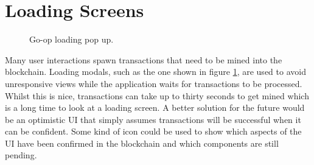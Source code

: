 \section{Loading Screens}
\begin{figure}
\centering
{}
\decoRule
\caption[Go-op Loading Pop Up]{Go-op loading pop up.}
\label{fig:waitpage}
\end{figure}

Many user interactions spawn transactions that need to be mined into the blockchain. Loading modals, such as the one shown in figure \ref{fig:waitpage}, are used to avoid unresponsive views while the application waits for transactions to be processed. Whilst this is nice, transactions can take up to thirty seconds to get mined which is a long time to look at a loading screen. A better solution for the future would be an optimistic UI that simply assumes transactions will be successful when it can be confident. Some kind of icon could be used to show which aspects of the UI have been confirmed in the blockchain and which components are still pending.
















